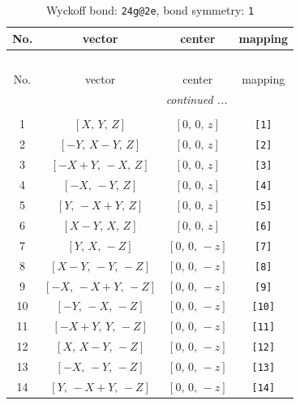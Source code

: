\documentclass[fleqn,8pt]{jsarticle}
\begin{document}
\begin{longtable}{cccc}
\caption{Wyckoff bond: {\tt 24g@2e}, bond symmetry: {\tt 1}}
 \\
 \hline \hline
No. & vector & center & mapping \\ \hline \endfirsthead

\multicolumn{3}{l}{\tablename\ \thetable{}} \\
 \hline \hline
No. & vector & center & mapping \\ \hline \endhead

 \hline \hline
\multicolumn{3}{r}{\footnotesize\it continued ...} \\ \endfoot

 \hline \hline
\multicolumn{3}{r}{} \\ \endlastfoot

1 & $\left[ X,\, Y,\, Z \right]$ & $\left[ 0,\, 0,\, z \right]$ & {\tt [1]} \\ \hline
2 & $\left[ - Y,\, X - Y,\, Z \right]$ & $\left[ 0,\, 0,\, z \right]$ & {\tt [2]} \\ \hline
3 & $\left[ - X + Y,\, - X,\, Z \right]$ & $\left[ 0,\, 0,\, z \right]$ & {\tt [3]} \\ \hline
4 & $\left[ - X,\, - Y,\, Z \right]$ & $\left[ 0,\, 0,\, z \right]$ & {\tt [4]} \\ \hline
5 & $\left[ Y,\, - X + Y,\, Z \right]$ & $\left[ 0,\, 0,\, z \right]$ & {\tt [5]} \\ \hline
6 & $\left[ X - Y,\, X,\, Z \right]$ & $\left[ 0,\, 0,\, z \right]$ & {\tt [6]} \\ \hline
7 & $\left[ Y,\, X,\, - Z \right]$ & $\left[ 0,\, 0,\, - z \right]$ & {\tt [7]} \\ \hline
8 & $\left[ X - Y,\, - Y,\, - Z \right]$ & $\left[ 0,\, 0,\, - z \right]$ & {\tt [8]} \\ \hline
9 & $\left[ - X,\, - X + Y,\, - Z \right]$ & $\left[ 0,\, 0,\, - z \right]$ & {\tt [9]} \\ \hline
10 & $\left[ - Y,\, - X,\, - Z \right]$ & $\left[ 0,\, 0,\, - z \right]$ & {\tt [10]} \\ \hline
11 & $\left[ - X + Y,\, Y,\, - Z \right]$ & $\left[ 0,\, 0,\, - z \right]$ & {\tt [11]} \\ \hline
12 & $\left[ X,\, X - Y,\, - Z \right]$ & $\left[ 0,\, 0,\, - z \right]$ & {\tt [12]} \\ \hline
13 & $\left[ - X,\, - Y,\, - Z \right]$ & $\left[ 0,\, 0,\, - z \right]$ & {\tt [13]} \\ \hline
14 & $\left[ Y,\, - X + Y,\, - Z \right]$ & $\left[ 0,\, 0,\, - z \right]$ & {\tt [14]} \\ \hline

\end{longtable}
\end{document}
